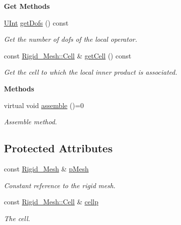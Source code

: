 \begin{Indent}{\bf Get Methods}\par
\begin{DoxyCompactItemize}
\item 
\hyperlink{namespaceFVCode3D_a4bf7e328c75d0fd504050d040ebe9eda}{U\+Int} \hyperlink{classFVCode3D_1_1local__MimeticOperator_a052b31cc0128915b383e00f8ba199875}{get\+Dofs} () const 
\begin{DoxyCompactList}\small\item\em Get the number of dofs of the local operator. \end{DoxyCompactList}\item 
const \hyperlink{classFVCode3D_1_1Rigid__Mesh_1_1Cell}{Rigid\+\_\+\+Mesh\+::\+Cell} \& \hyperlink{classFVCode3D_1_1local__MimeticOperator_a70ba32e87d122a734d44ef19fffbb17c}{get\+Cell} () const 
\begin{DoxyCompactList}\small\item\em Get the cell to which the local inner product is associated. \end{DoxyCompactList}\end{DoxyCompactItemize}
\end{Indent}
\begin{Indent}{\bf Methods}\par
\begin{DoxyCompactItemize}
\item 
virtual void \hyperlink{classFVCode3D_1_1local__MimeticOperator_a3ba6c8741558f4be2be8fcd73e10311d}{assemble} ()=0
\begin{DoxyCompactList}\small\item\em Assemble method. \end{DoxyCompactList}\end{DoxyCompactItemize}
\end{Indent}
\subsection*{Protected Attributes}
\begin{DoxyCompactItemize}
\item 
const \hyperlink{classFVCode3D_1_1Rigid__Mesh}{Rigid\+\_\+\+Mesh} \& \hyperlink{classFVCode3D_1_1local__MimeticOperator_aaedb6f563c6c3c28afadc1d3725b3f71}{p\+Mesh}
\begin{DoxyCompactList}\small\item\em Constant reference to the rigid mesh. \end{DoxyCompactList}\item 
const \hyperlink{classFVCode3D_1_1Rigid__Mesh_1_1Cell}{Rigid\+\_\+\+Mesh\+::\+Cell} \& \hyperlink{classFVCode3D_1_1local__MimeticOperator_a771437af467a250d8bcaf1d06372ae8e}{cellp}
\begin{DoxyCompactList}\small\item\em The cell. \end{DoxyCompactList}\end{DoxyCompactItemize}



